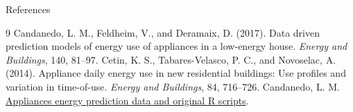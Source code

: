 \documentclass[aspectratio=169,11pt]{beamer}
\begin{document}
\begin{frame}{References}
\footnotesize
\begin{thebibliography}{9}
Candanedo, L. M., Feldheim, V., and Deramaix, D. (2017).
\newblock Data driven prediction models of energy use of appliances in a low-energy house.
\newblock \emph{Energy and Buildings}, 140, 81--97.
Cetin, K. S., Tabares-Velasco, P. C., and Novoselac, A. (2014).
\newblock Appliance daily energy use in new residential buildings: Use profiles and variation in time-of-use.
\newblock \emph{Energy and Buildings}, 84, 716--726.
Candanedo, L. M. \href{https://github.com/LuisM78/Appliances-energy-prediction-data}{\textcolor{MainBlue}{Appliances energy prediction data and original R scripts}}.
\end{thebibliography}
\end{frame}
\end{document}
